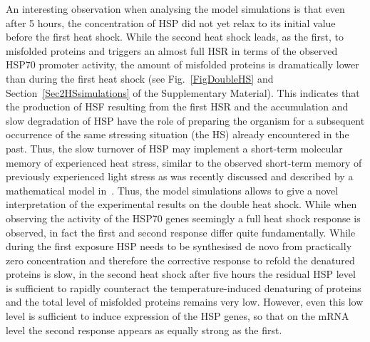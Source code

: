 \documentclass[oneside, 10pt, a4paper, twocolumn]{article}
\begin{document}
An interesting observation when analysing the model simulations is
that even after 5 hours, the concentration of HSP did not yet relax
to its initial value before the first heat shock. 
While the second heat shock leads, as the first, to misfolded
proteins and triggers an almost full HSR in terms of 
the observed HSP70 promoter activity, the amount of misfolded proteins
is dramatically lower than during the first heat shock (see Fig.~\ref{FigDoubleHS} 
and Section~\ref{Sec2HSsimulations} of the Supplementary Material). 
This indicates that the 
production of HSF resulting from the first HSR and the accumulation
and slow degradation of HSP have the role of preparing the organism for
a subsequent occurrence of the same stressing situation (the HS)
already encountered in the past. Thus, the slow turnover of HSP may
implement a short-term molecular memory of experienced heat stress,
similar to the observed short-term memory of previously experienced light
stress as was recently discussed and described by a mathematical model 
in~\cite{Matuszynska2016}.
Thus, the model simulations allows to give a novel interpretation of
the experimental results on the double heat shock. While when observing the
activity of the HSP70 genes seemingly a full heat shock response is
observed, in fact the first and second response differ quite fundamentally.
While during the first exposure HSP needs to be synthesised de novo
from practically zero concentration and therefore the corrective
response to refold the denatured proteins is slow, in the second heat
shock after five hours the residual HSP level is sufficient to rapidly
counteract the temperature-induced denaturing of proteins and the total
level of misfolded proteins remains very low. However, even this low level is
sufficient to induce expression of the HSP genes, so that on the mRNA level
the second response appears as equally strong as the first.


\end{document}
